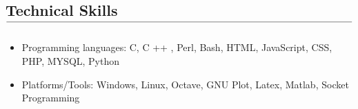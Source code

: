 \documentclass[10pt,letterpaper]{article}
\makeatletter
\newcommand{\headerrow}[2]
{\begin{tabular*}{\linewidth}{l@{\extracolsep{\fill}}r}
	#1 &
	#2 \\
\end{tabular*}}
\newcommand\tline[2]{$\underset{\text{#1}}{\text{\underline{\hspace{#2}}}}$}
\makeatother
\begin{document}
\begin{itemize}[label=$\ $]
		

		
		

 
		
		

	
	

\end{itemize}







\vspace{-1.8em}
\subsection*{Technical Skills \textbf{ \tline{}{5.70in}}}
\vspace{-0.75em}
\begin{itemize}
	\setlength{\itemsep}{3pt}
		\item Programming languages: C, C ++ , Perl, Bash, HTML, JavaScript, CSS, PHP, MYSQL, Python

\item Platforms/Tools: Windows, Linux, Octave, GNU Plot, Latex, Matlab, Socket Programming
		
		
	\end{itemize}
\end{document}
